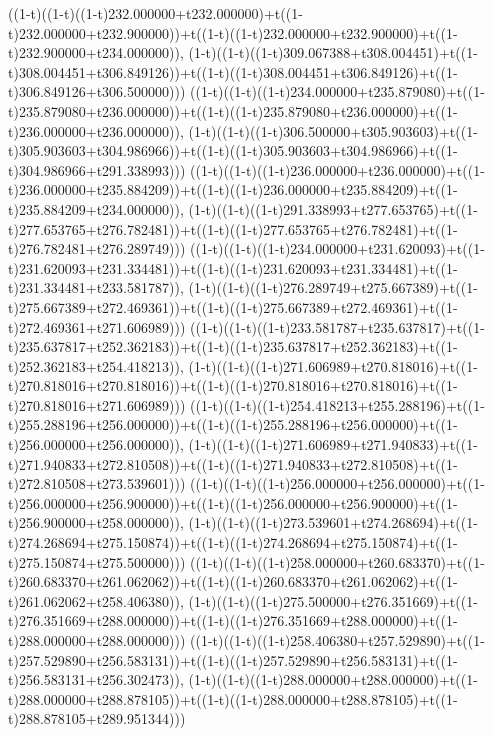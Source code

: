((1-t)((1-t)((1-t)232.000000+t232.000000)+t((1-t)232.000000+t232.900000))+t((1-t)((1-t)232.000000+t232.900000)+t((1-t)232.900000+t234.000000)),                                     (1-t)((1-t)((1-t)309.067388+t308.004451)+t((1-t)308.004451+t306.849126))+t((1-t)((1-t)308.004451+t306.849126)+t((1-t)306.849126+t306.500000)))
((1-t)((1-t)((1-t)234.000000+t235.879080)+t((1-t)235.879080+t236.000000))+t((1-t)((1-t)235.879080+t236.000000)+t((1-t)236.000000+t236.000000)),                                     (1-t)((1-t)((1-t)306.500000+t305.903603)+t((1-t)305.903603+t304.986966))+t((1-t)((1-t)305.903603+t304.986966)+t((1-t)304.986966+t291.338993)))
((1-t)((1-t)((1-t)236.000000+t236.000000)+t((1-t)236.000000+t235.884209))+t((1-t)((1-t)236.000000+t235.884209)+t((1-t)235.884209+t234.000000)),                                     (1-t)((1-t)((1-t)291.338993+t277.653765)+t((1-t)277.653765+t276.782481))+t((1-t)((1-t)277.653765+t276.782481)+t((1-t)276.782481+t276.289749)))
((1-t)((1-t)((1-t)234.000000+t231.620093)+t((1-t)231.620093+t231.334481))+t((1-t)((1-t)231.620093+t231.334481)+t((1-t)231.334481+t233.581787)),                                     (1-t)((1-t)((1-t)276.289749+t275.667389)+t((1-t)275.667389+t272.469361))+t((1-t)((1-t)275.667389+t272.469361)+t((1-t)272.469361+t271.606989)))
((1-t)((1-t)((1-t)233.581787+t235.637817)+t((1-t)235.637817+t252.362183))+t((1-t)((1-t)235.637817+t252.362183)+t((1-t)252.362183+t254.418213)),                                     (1-t)((1-t)((1-t)271.606989+t270.818016)+t((1-t)270.818016+t270.818016))+t((1-t)((1-t)270.818016+t270.818016)+t((1-t)270.818016+t271.606989)))
((1-t)((1-t)((1-t)254.418213+t255.288196)+t((1-t)255.288196+t256.000000))+t((1-t)((1-t)255.288196+t256.000000)+t((1-t)256.000000+t256.000000)),                                     (1-t)((1-t)((1-t)271.606989+t271.940833)+t((1-t)271.940833+t272.810508))+t((1-t)((1-t)271.940833+t272.810508)+t((1-t)272.810508+t273.539601)))
((1-t)((1-t)((1-t)256.000000+t256.000000)+t((1-t)256.000000+t256.900000))+t((1-t)((1-t)256.000000+t256.900000)+t((1-t)256.900000+t258.000000)),                                     (1-t)((1-t)((1-t)273.539601+t274.268694)+t((1-t)274.268694+t275.150874))+t((1-t)((1-t)274.268694+t275.150874)+t((1-t)275.150874+t275.500000)))
((1-t)((1-t)((1-t)258.000000+t260.683370)+t((1-t)260.683370+t261.062062))+t((1-t)((1-t)260.683370+t261.062062)+t((1-t)261.062062+t258.406380)),                                     (1-t)((1-t)((1-t)275.500000+t276.351669)+t((1-t)276.351669+t288.000000))+t((1-t)((1-t)276.351669+t288.000000)+t((1-t)288.000000+t288.000000)))
((1-t)((1-t)((1-t)258.406380+t257.529890)+t((1-t)257.529890+t256.583131))+t((1-t)((1-t)257.529890+t256.583131)+t((1-t)256.583131+t256.302473)),                                     (1-t)((1-t)((1-t)288.000000+t288.000000)+t((1-t)288.000000+t288.878105))+t((1-t)((1-t)288.000000+t288.878105)+t((1-t)288.878105+t289.951344)))
